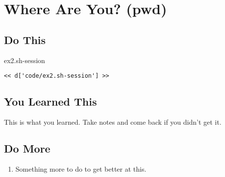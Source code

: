 \chapter{Where Are You? (pwd)}

\section{Do This}

\begin{code}{ex2.sh-session}
\begin{Verbatim}
<< d['code/ex2.sh-session'] >>
\end{Verbatim}
\end{code}


\section{You Learned This}

This is what you learned.  Take notes and come back if you didn't get it.

\section{Do More}

\begin{enumerate}
\item Something more to do to get better at this.
\end{enumerate}

